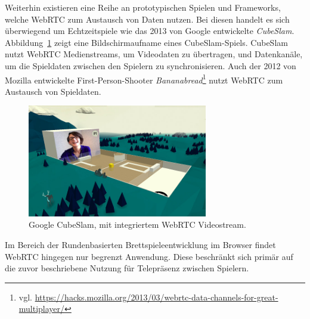 Weiterhin existieren eine Reihe an prototypischen Spielen und Frameworks, welche \acs{WebRTC} zum Austausch von Daten nutzen. Bei diesen handelt es sich überwiegend um Echtzeitspiele wie das 2013 von Google entwickelte \textit{CubeSlam}. Abbildung~\ref{fig:cuubslam} zeigt eine Bildschirmaufname eines CubeSlam-Spiels. CubeSlam nutzt \acs{WebRTC} Medienstreams, um Videodaten zu übertragen, und Datenkanäle, um die Spieldaten zwischen den Spielern zu synchronisieren. Auch der 2012 von Mozilla entwickelte First-Person-Shooter \textit{Bananabread}\footnote{vgl. \url{https://hacks.mozilla.org/2013/03/webrtc-data-channels-for-great-multiplayer/}} nutzt WebRTC zum Austausch von Spieldaten.\par

\begin{figure}[h]
\centering
\includegraphics[width=0.70\textwidth]{bilder/cubeslam.jpg}
\caption{Google CubeSlam, mit integriertem WebRTC Videostream.}
\label{fig:cuubslam}
\end{figure}

Im Bereich der Rundenbasierten Brettspieleentwicklung im Browser findet WebRTC hingegen nur begrenzt Anwendung. Diese beschränkt sich primär auf die zuvor beschriebene Nutzung für Telepräsenz zwischen Spielern.\par
